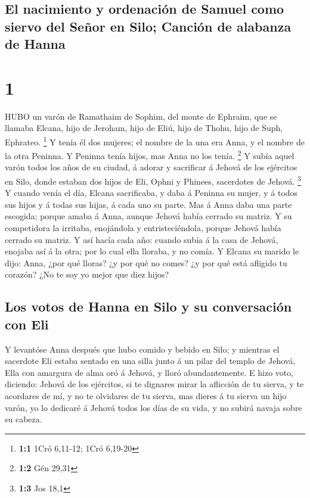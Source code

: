 \hypertarget{el-nacimiento-y-ordenaciuxf3n-de-samuel-como-siervo-del-seuxf1or-en-silo-canciuxf3n-de-alabanza-de-hanna}{%
\subsection{El nacimiento y ordenación de Samuel como siervo del Señor
en Silo; Canción de alabanza de
Hanna}\label{el-nacimiento-y-ordenaciuxf3n-de-samuel-como-siervo-del-seuxf1or-en-silo-canciuxf3n-de-alabanza-de-hanna}}

\hypertarget{section}{%
\section{1}\label{section}}

 HUBO un varón de Ramathaim de Sophim, del monte de Ephraim,
que se llamaba Elcana, hijo de Jeroham, hijo de Eliú, hijo de Thohu,
hijo de Suph, Ephrateo. \footnote{\textbf{1:1} 1Cró 6,11-12; 1Cró
  6,19-20}  Y tenía él dos mujeres; el nombre de la una era
Anna, y el nombre de la otra Peninna. Y Peninna tenía hijos, mas Anna no
los tenía. \footnote{\textbf{1:2} Gén 29,31}  Y subía aquel
varón todos los años de su ciudad, á adorar y sacrificar á Jehová de los
ejércitos en Silo, donde estaban dos hijos de Eli, Ophni y Phinees,
sacerdotes de Jehová. \footnote{\textbf{1:3} Jos 18,1}  Y
cuando venía el día, Elcana sacrificaba, y daba á Peninna su mujer, y á
todos sus hijos y á todas sus hijas, á cada uno su parte. 
Mas á Anna daba una parte escogida; porque amaba á Anna, aunque Jehová
había cerrado su matriz.  Y su competidora la irritaba,
enojándola y entristeciéndola, porque Jehová había cerrado su matriz.
 Y así hacía cada año: cuando subía á la casa de Jehová,
enojaba así á la otra; por lo cual ella lloraba, y no comía.
 Y Elcana su marido le dijo: Anna, ¿por qué lloras? ¿y por
qué no comes? ¿y por qué está afligido tu corazón? ¿No te soy yo mejor
que diez hijos?

\hypertarget{los-votos-de-hanna-en-silo-y-su-conversaciuxf3n-con-eli}{%
\subsection{Los votos de Hanna en Silo y su conversación con
Eli}\label{los-votos-de-hanna-en-silo-y-su-conversaciuxf3n-con-eli}}

 Y levantóse Anna después que hubo comido y bebido en Silo;
y mientras el sacerdote Eli estaba sentado en una silla junto á un pilar
del templo de Jehová,  Ella con amargura de alma oró á
Jehová, y lloró abundantemente.  E hizo voto, diciendo:
Jehová de los ejércitos, si te dignares mirar la aflicción de tu sierva,
y te acordares de mí, y no te olvidares de tu sierva, mas dieres á tu
sierva un hijo varón, yo lo dedicaré á Jehová todos los días de su vida,
y no subirá navaja sobre su cabeza.

